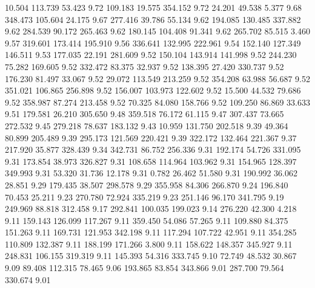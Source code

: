   10.504  113.739   53.423         9.72
 109.183   19.575  354.152         9.72
  24.201   49.538    5.377         9.68
 348.473  105.604   24.175         9.67
 277.416   39.786   55.134         9.62
 194.085  130.485  337.882         9.62
 284.539   90.172  265.463         9.62
 180.145  104.408   91.341         9.62
 265.702   85.515    3.460         9.57
 319.601  173.414  195.910         9.56
 336.641  132.995  222.961         9.54
 152.140  127.349  146.511         9.53
 177.035   22.191  281.609         9.52
 150.104  143.914  141.998         9.52
 244.230   75.282  169.605         9.52
 332.472   83.375   32.937         9.52
 138.395   27.420  330.737         9.52
 176.230   81.497   33.067         9.52
  29.072  113.549  213.259         9.52
 354.208   63.988   56.687         9.52
 351.021  106.865  256.898         9.52
 156.007  103.973  122.602         9.52
  15.500   44.532   79.686         9.52
 358.987   87.274  213.458         9.52
  70.325   84.080  158.766         9.52
 109.250   86.869   33.633         9.51
 179.581   26.210  305.650         9.48
 359.518   76.172   61.115         9.47
 307.437   73.665  272.532         9.45
 279.218   78.637  183.132         9.43
  10.959  131.750  202.518         9.39
  49.364   80.899  205.489         9.39
 295.173  121.569  220.421         9.39
 322.172  132.464  221.367         9.37
 217.920   35.877  328.439         9.34
 342.731   86.752  256.336         9.31
 192.174   54.726  331.095         9.31
 173.854   38.973  326.827         9.31
 108.658  114.964  103.962         9.31
 154.965  128.397  349.993         9.31
  53.320   31.736   12.178         9.31
   0.782   26.462   51.580         9.31
 190.992   36.062   28.851         9.29
 179.435   38.507  298.578         9.29
 355.958   84.306  266.870         9.24
 196.840   70.453   25.211         9.23
 270.780   72.924  335.219         9.23
 251.146   96.170  341.795         9.19
 249.969   88.818  312.458         9.17
 292.841  100.035  199.023         9.14
 276.220   42.300    4.218         9.11
 159.143  126.099  117.267         9.11
 359.450   54.086   57.265         9.11
 109.880   84.375  151.263         9.11
 169.731  121.953  342.198         9.11
 117.294  107.722   42.951         9.11
 354.285  110.809  132.387         9.11
 188.199  171.266    3.800         9.11
 158.622  148.357  345.927         9.11
 248.831  106.155  319.319         9.11
 145.393   54.316  333.745         9.10
  72.749   48.532   30.867         9.09
  89.408  112.315   78.465         9.06
 193.865   83.854  343.866         9.01
 287.700   79.564  330.674         9.01
